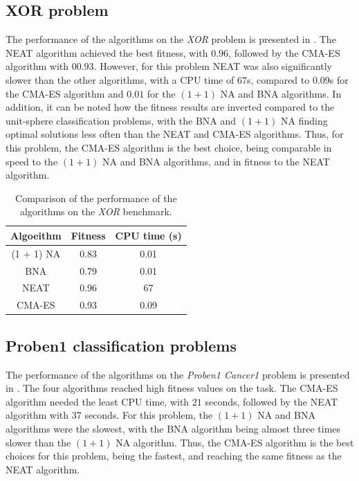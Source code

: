 \subsection{XOR problem}

The performance of the algorithms on the \textit{XOR} problem is presented in .
The NEAT algorithm achieved the best fitness, with $0.96$, followed by the CMA-ES algorithm with $00.93$. However, for this problem NEAT was also significantly slower than the other algorithms,
with a CPU time of $67$s, compared to $0.09$s for the CMA-ES algorithm and $0.01$ for the $(1 + 1)$ NA and BNA algorithms.
In addition, it can be noted how the fitness results are inverted compared to the unit-sphere classification problems, with the BNA and $(1 + 1)$ NA finding optimal solutions less often
than the NEAT and CMA-ES algorithms.
Thus, for this problem, the CMA-ES algorithm is the best choice, being comparable in speed to the $(1 + 1)$ NA and BNA algorithms, and in fitness to the NEAT algorithm.

\begin{table}
    \caption{Comparison of the performance of the algorithms on the \textit{XOR} benchmark.}
    \label{tab:comparison_xor}
    \centering
    \begin{tabular}{ |c|c|c| }
        \hline
        Algoeithm & Fitness & CPU time (s) \\
        \hline
        (1 + 1) NA & 0.83 & 0.01 \\
        \hline
        BNA & 0.79 & 0.01 \\
        \hline
        NEAT & 0.96 & 67 \\
        \hline
        CMA-ES & 0.93 & 0.09 \\
        \hline\hline
    \end{tabular}
\end{table}

\subsection{Proben1 classification problems}

The performance of the algorithms on the \textit{Proben1 Cancer1} problem is presented in .
The four algorithms reached high fitness values on the task. The CMA-ES algorithm needed the least CPU time, with $21$ seconds, followed by the NEAT algorithm with $37$ seconds.
For this problem, the $(1 + 1)$ NA and BNA algorithms were the slowest, with the BNA algorithm being almost three times slower than the $(1 + 1)$ NA algorithm.
Thus, the CMA-ES algorithm is the best choices for this problem, being the fastest, and reaching the same fitness as the NEAT algorithm.

